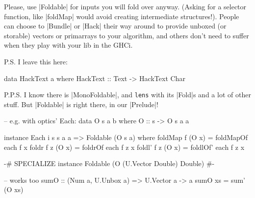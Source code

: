 Please, use |Foldable| for inputs you will fold over anyway.
(Asking for a selector function, like |foldMap| would avoid creating intermediate structures!).
People can choose to |Bundle| or |Hack| their way around to provide unboxed (or storable) vectors or
primarrays to your algorithm, and others don't need to suffer when they play with your lib in the GHCi.


P.S. I leave this here:

\begin{code}
data HackText a where
    HackText :: Text -> HackText Char
\end{code}

P.P.S. I know there is |MonoFoldable|, and \texttt{lens} with its |Fold|s and a lot of other stuff. But |Foldable| is right there, in our |Prelude|!

\begin{code}
-- e.g. with optics' Each:
data O s a b where
    O :: s -> O s a a

instance Each i s s a a => Foldable (O s a) where
    foldMap f  (O x) = foldMapOf each f   x
    foldr  f z (O x) = foldrOf   each f z x
    foldl' f z (O x) = foldlOf'  each f z x

    {-# SPECIALIZE instance Foldable (O (U.Vector Double) Double) #-}

-- works too
sumO :: (Num a, U.Unbox a) => U.Vector a -> a
sumO xs = sum' (O xs)
\end{code}
